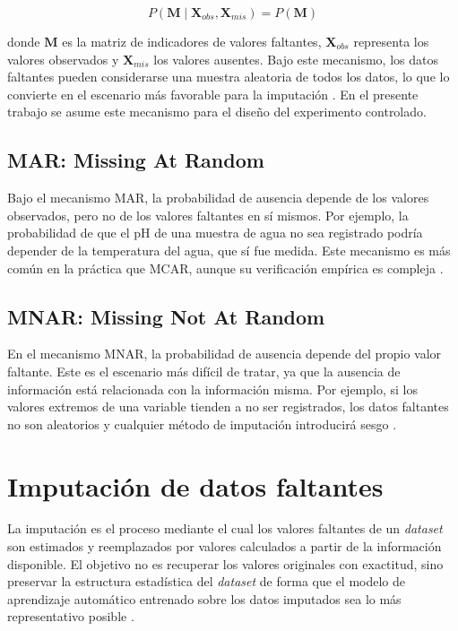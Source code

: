 \begin{equation}
    P(\mathbf{M} \mid \mathbf{X}_{obs}, \mathbf{X}_{mis}) = P(\mathbf{M})
\end{equation}

donde $\mathbf{M}$ es la matriz de indicadores de valores faltantes,
$\mathbf{X}_{obs}$ representa los valores observados y $\mathbf{X}_{mis}$
los valores ausentes. Bajo este mecanismo, los datos faltantes pueden
considerarse una muestra aleatoria de todos los datos, lo que lo convierte
en el escenario más favorable para la imputación \parencite{little2019}.
En el presente trabajo se asume este mecanismo para el diseño del
experimento controlado.

\subsection{MAR: Missing At Random}

Bajo el mecanismo MAR, la probabilidad de ausencia depende de los valores
observados, pero no de los valores faltantes en sí mismos. Por ejemplo,
la probabilidad de que el pH de una muestra de agua no sea registrado
podría depender de la temperatura del agua, que sí fue medida. Este
mecanismo es más común en la práctica que MCAR, aunque su verificación
empírica es compleja \parencite{little2019}.

\subsection{MNAR: Missing Not At Random}

En el mecanismo MNAR, la probabilidad de ausencia depende del propio valor
faltante. Este es el escenario más difícil de tratar, ya que la ausencia
de información está relacionada con la información misma. Por ejemplo, si
los valores extremos de una variable tienden a no ser registrados, los
datos faltantes no son aleatorios y cualquier método de imputación
introducirá sesgo \parencite{garcia2017}.

\section{Imputación de datos faltantes}

La imputación es el proceso mediante el cual los valores faltantes de un
\textit{dataset} son estimados y reemplazados por valores calculados a partir de la
información disponible. El objetivo no es recuperar los valores originales
con exactitud, sino preservar la estructura estadística del \textit{dataset} de forma
que el modelo de aprendizaje automático entrenado sobre los datos imputados
sea lo más representativo posible \parencite{salgado2016}.

